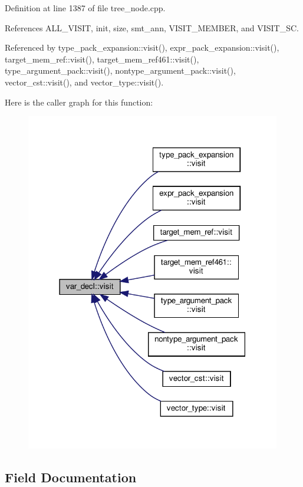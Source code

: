 Definition at line 1387 of file tree\+\_\+node.\+cpp.



References A\+L\+L\+\_\+\+V\+I\+S\+IT, init, size, smt\+\_\+ann, V\+I\+S\+I\+T\+\_\+\+M\+E\+M\+B\+ER, and V\+I\+S\+I\+T\+\_\+\+SC.



Referenced by type\+\_\+pack\+\_\+expansion\+::visit(), expr\+\_\+pack\+\_\+expansion\+::visit(), target\+\_\+mem\+\_\+ref\+::visit(), target\+\_\+mem\+\_\+ref461\+::visit(), type\+\_\+argument\+\_\+pack\+::visit(), nontype\+\_\+argument\+\_\+pack\+::visit(), vector\+\_\+cst\+::visit(), and vector\+\_\+type\+::visit().

Here is the caller graph for this function\+:
\nopagebreak
\begin{figure}[H]
\begin{center}
\leavevmode
\includegraphics[width=316pt]{dc/dc8/structvar__decl_ad28f066d3483ec9ca4b7839c1af19c6f_icgraph}
\end{center}
\end{figure}


\subsection{Field Documentation}
\mbox{\label{structvar__decl_addd62259715bc6aba964518eced2917d}} 
